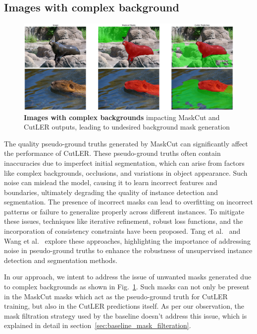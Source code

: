 \subsection{Images with complex background}
\begin{figure}
	\centering
	\includegraphics[width=1\textwidth]{Images/main/cutler-prob-noisy-bg.png}
	\caption[\textbf{Cutler performance on images with complex background}]{\textbf{Images with complex backgrounds} impacting MaskCut and CutLER outputs, leading to undesired background mask generation}
	\label{fig:cutler_noisy_bg_eg}
\end{figure}

The quality pseudo-ground truths generated by MaskCut can significantly affect the performance of CutLER. These pseudo-ground truths often contain inaccuracies due to imperfect initial segmentation, which can arise from factors like complex backgrounds, occlusions, and variations in object appearance. Such noise can mislead the model, causing it to learn incorrect features and boundaries, ultimately degrading the quality of instance detection and segmentation. The presence of incorrect masks can lead to overfitting on incorrect patterns or failure to generalize properly across different instances. To mitigate these issues, techniques like iterative refinement, robust loss functions, and the incorporation of consistency constraints have been proposed. Tang et al.~\cite{Tang_2018_CVPR} and Wang et al.~\cite{ziegler2022selfsupervisedlearningobjectparts} explore these approaches, highlighting the importance of addressing noise in pseudo-ground truths to enhance the robustness of unsupervised instance detection and segmentation methods.

In our approach, we intent to address the issue of unwanted masks generated due to complex backgrounds as shown in Fig.~\ref{fig:cutler_noisy_bg_eg}. Such masks can not only be present in the MaskCut masks which act as the pseudo-ground truth for CutLER training, but also in the CutLER predictions itself. As per our observation, the mask filtration strategy used by the baseline doesn't address this issue, which is explained in detail in section~\ref{sec:baseline_mask_filteration}.

